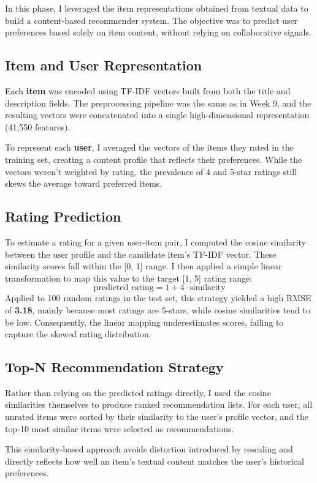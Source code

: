\documentclass[11pt,a4paper]{article}
\begin{document}
In this phase, I leveraged the item representations obtained from textual data to build a content-based recommender system. The objective was to predict user preferences based solely on item content, without relying on collaborative signals.

\subsection{Item and User Representation}
Each \textbf{item} was encoded using TF-IDF vectors built from both the title and description fields. The preprocessing pipeline was the same as in Week 9, and the resulting vectors were concatenated into a single high-dimensional representation (41,550 features).

To represent each \textbf{user}, I averaged the vectors of the items they rated in the training set, creating a content profile that reflects their preferences. While the vectors weren’t weighted by rating, the prevalence of 4 and 5-star ratings still skews the average toward preferred items.

\subsection{Rating Prediction}
To estimate a rating for a given user-item pair, I computed the cosine similarity between the user profile and the candidate item's TF-IDF vector. These similarity scores fall within the [0, 1] range. I then applied a simple linear transformation to map this value to the target [1, 5] rating range:
\[
\mathrm{predicted\_rating} = 1 + 4 \cdot \mathrm{similarity}
\]
Applied to 100 random ratings in the test set, this strategy yielded a high RMSE of \textbf{3.18}, mainly because most ratings are 5-stars, while cosine similarities tend to be low. Consequently, the linear mapping underestimates scores, failing to capture the skewed rating distribution.

\subsection{Top-N Recommendation Strategy}
Rather than relying on the predicted ratings directly, I used the cosine similarities themselves to produce ranked recommendation lists. For each user, all unrated items were sorted by their similarity to the user's profile vector, and the top-10 most similar items were selected as recommendations.

This similarity-based approach avoids distortion introduced by rescaling and directly reflects how well an item's textual content matches the user's historical preferences.
\end{document}
